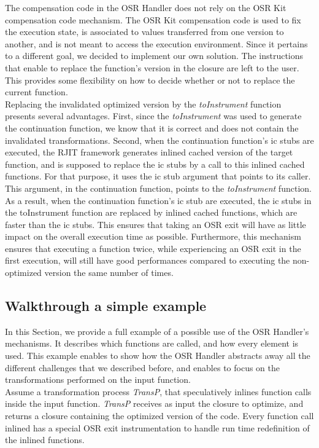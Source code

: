The compensation code in the OSR Handler does not rely on the OSR Kit compensation code mechanism.
The OSR Kit compensation code is used to fix the execution state, is associated to values transferred from one version to another, and is not meant to access the execution environment.
Since it pertains to a different goal, we decided to implement our own solution.
The instructions that enable to replace the function's version in the closure are left to the user. 
This provides some flexibility on how to decide whether or not to replace the current function.\\

Replacing the invalidated optimized version by the \textit{toInstrument} function presents several advantages.
First, since the \textit{toInstrument} was used to generate the continuation function, we know that it is correct and does not contain the invalidated transformations.
Second, when the continuation function's ic stubs are executed, the RJIT framework generates inlined cached version of the target function, and is supposed to replace the ic stubs by a call to this inlined cached functions.
For that purpose, it uses the ic stub argument that points to its caller.
This argument, in the continuation function, points to the \textit{toInstrument} function.
As a result, when the continuation function's ic stub are executed, the ic stubs in the toInstrument function are replaced by inlined cached functions, which are faster than the ic stubs.
This ensures that taking an OSR exit will have as little impact on the overall execution time as possible.
Furthermore, this mechanism ensures that executing a function twice, while experiencing an OSR exit in the first execution, will still have good performances compared to executing the non-optimized version the same number of times.\\

\subsection{Walkthrough a simple example}
In this Section, we provide a full example of a possible use of the OSR Handler's mechanisms.
It describes which functions are called, and how every element is used.
This example enables to show how the OSR Handler abstracts away all the different challenges that we described before, and enables to focus on the transformations performed on the input function.\\

Assume a transformation process \textit{TransP}, that speculatively inlines function calls inside the input function. 
\textit{TransP} receives as input the closure to optimize, and returns a closure containing the optimized version of the code.
Every function call inlined has a special OSR exit instrumentation to handle run time redefinition of the inlined functions.\\

